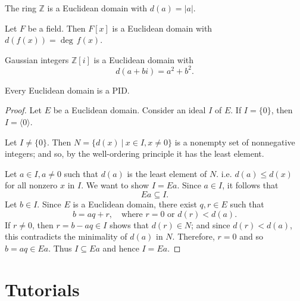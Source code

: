 \begin{example}
    The ring $\mathbb{Z}$ is a Euclidean domain with $d(a) = |a|$.
\end{example}

\begin{example}
    Let $F$ be a field. Then $F[x]$ is a Euclidean domain with $d(f(x)) = \deg\, f(x)$.
\end{example}

\begin{example}
    Gaussian integers $\mathbb{Z}[i]$ is a Euclidean domain with
    \[
        d(a+bi) = a^2 + b^2.
    \]
\end{example}

\begin{theorem}
    Every Euclidean domain is a PID.
\end{theorem}
\begin{proof}
    Let $E$ be a Euclidean domain. Consider an ideal $I$ of $E$. If $I = \{ 0 \}$, then 
    $I = \langle 0 \rangle$.

    Let $I \neq \{ 0 \}$. Then $N = \{ d(x) \> | \> x \in I, x \neq 0 \}$ is a nonempty 
    set of nonnegative integers; and so, by the well-ordering principle 
    it has the least element.

    Let $a \in I, a \neq 0$ such that $d(a)$ is the least element of $N$. i.e. $d(a) \leq d(x)$ for all 
    nonzero $x$ in $I$. We want to show $I = Ea$. Since $a \in I$, it follows that 
    \[
        Ea \subseteq I.
    \]
    Let $b \in I$. Since $E$ is a Euclidean domain, there exist $q, r \in E$ such that 
    \[
        b = aq+r, \quad \text{where } r = 0 \text{ or } d(r) < d(a).
    \]
    If $r \neq 0$, then $r = b - aq \in I$ shows that $d(r) \in N$; and since 
    $d(r) < d(a)$, this contradicts the minimality of $d(a)$ in $N$. Therefore, $r = 0$ and so $b = aq \in Ea$.
    Thus $I \subseteq Ea$ and hence $I = Ea$.
\end{proof}

\section*{Tutorials}

